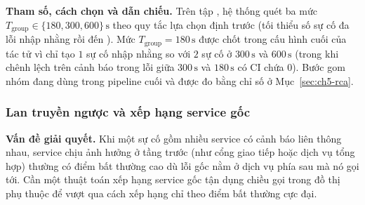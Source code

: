 \textbf{Tham số, cách chọn và dẫn chiếu.} Trên tập , hệ thống quét ba mức $T_{\text{group}} \in \{180, 300, 600\}\,\text{s}$ theo quy tắc lựa chọn định trước (tối thiểu số sự cố đa lỗi nhập nhằng  rồi đến ). Mức $T_{\text{group}} = 180\,\text{s}$ được chốt trong cấu hình cuối của tác tử  vì chỉ tạo $1$ sự cố nhập nhằng so với $2$ sự cố ở $300\,\text{s}$ và $600\,\text{s}$ (trong khi chênh lệch  trên cảnh báo trong lỗi giữa $300\,\text{s}$ và $180\,\text{s}$ có CI chứa $0$). Bước gom nhóm đang dùng trong pipeline cuối và được đo bằng chỉ số  ở Mục~\ref{sec:ch5-rca}.

\subsubsection{Lan truyền ngược và xếp hạng service gốc}
\label{sec:ch4-propagation}

\textbf{Vấn đề giải quyết.} Khi một sự cố gồm nhiều service có cảnh báo liên thông nhau, service chịu ảnh hưởng ở tầng trước (như cổng giao tiếp hoặc dịch vụ tổng hợp) thường có điểm bất thường cao dù lỗi gốc nằm ở dịch vụ phía sau mà nó gọi tới. Cần một thuật toán xếp hạng service gốc tận dụng chiều gọi trong đồ thị phụ thuộc để vượt qua cách xếp hạng chỉ theo điểm bất thường cực đại.

